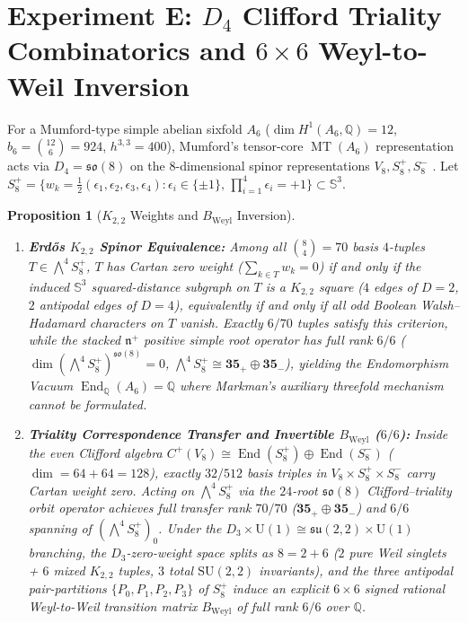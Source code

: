 \documentclass[11pt,a4paper]{amsart}
\newtheorem{proposition}[theorem]{Proposition}
\theoremstyle{definition}
\theoremstyle{remark}
\DeclareMathOperator{\End}{End}
\DeclareMathOperator{\MT}{MT}
\begin{document}
\section{Experiment E: \texorpdfstring{$D_4$}{D4} Clifford Triality Combinatorics and \texorpdfstring{$6 \times 6$}{6x6} Weyl-to-Weil Inversion}
\label{sec:thmE}

For a Mumford-type simple abelian sixfold $A_6$ ($\dim H^1(A_6,\mathbb{Q}) = 12$, $b_6 = \binom{12}{6} = 924$, $h^{3,3} = 400$), Mumford's tensor-core $\MT(A_6)$ representation acts via $D_4 = \mathfrak{so}(8)$ on the $8$-dimensional spinor representations $V_8, S^+_8, S^-_8$ \cite{Mumford1969}. Let $S^+_8 = \{w_k = \frac{1}{2}(\epsilon_1,\epsilon_2,\epsilon_3,\epsilon_4) : \epsilon_i \in \{\pm 1\},\, \prod_{i=1}^4 \epsilon_i = +1\} \subset \mathbb{S}^3$.

\begin{proposition}[$K_{2,2}$ Weights and $B_{\mathrm{Weyl}}$ Inversion]
\label{thm:E}
\begin{enumerate}[label=(\roman*)]
\item \textbf{Erd\H{o}s $K_{2,2}$ Spinor Equivalence:} Among all $\binom{8}{4} = 70$ basis $4$-tuples $T \in \bigwedge^4 S^+_8$, $T$ has Cartan zero weight ($\sum_{k\in T} w_k = 0$) if and only if the induced $\mathbb{S}^3$ squared-distance subgraph on $T$ is a $K_{2,2}$ square ($4$ edges of $D=2$, $2$ antipodal edges of $D=4$), equivalently if and only if all odd Boolean Walsh--Hadamard characters on $T$ vanish. Exactly $6/70$ tuples satisfy this criterion, while the stacked $\mathfrak{n}^+$ positive simple root operator has full rank $6/6$ ($\dim(\bigwedge^4 S^+_8)^{\mathfrak{so}(8)} = 0$, $\bigwedge^4 S^+_8 \cong \mathbf{35}_+ \oplus \mathbf{35}_-$), yielding the Endomorphism Vacuum $\End_{\mathbb{Q}}(A_6) = \mathbb{Q}$ where Markman's auxiliary threefold mechanism \cite{Markman2025} cannot be formulated.
\item \textbf{Triality Correspondence Transfer and Invertible $B_{\mathrm{Weyl}}$ ($6/6$):} Inside the even Clifford algebra $C^+(V_8) \cong \End(S^+_8) \oplus \End(S^-_8)$ ($\dim = 64 + 64 = 128$), exactly $32/512$ basis triples in $V_8 \times S^+_8 \times S^-_8$ carry Cartan weight zero. Acting on $\bigwedge^4 S^+_8$ via the $24$-root $\mathfrak{so}(8)$ Clifford--triality orbit operator achieves full transfer rank $70/70$ ($\mathbf{35}_+ \oplus \mathbf{35}_-$) and $6/6$ spanning of $(\bigwedge^4 S^+_8)_0$. Under the $D_3 \times \mathrm{U}(1) \cong \mathfrak{su}(2,2) \times \mathrm{U}(1)$ branching, the $D_3$-zero-weight space splits as $8 = 2 + 6$ ($2$ pure Weil singlets + $6$ mixed $K_{2,2}$ tuples, $3$ total $\mathrm{SU}(2,2)$ invariants), and the three antipodal pair-partitions $\{P_0,P_1,P_2,P_3\}$ of $S^+_8$ induce an explicit $6 \times 6$ signed rational Weyl-to-Weil transition matrix $B_{\mathrm{Weyl}}$ of full rank $6/6$ over $\mathbb{Q}$.
\end{enumerate}
\end{proposition}
\end{document}
